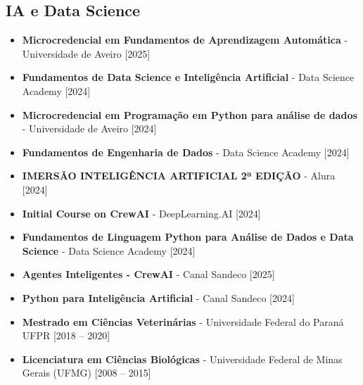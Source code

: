 \documentclass[11pt]{article}
\begin{document}
\subsection*{IA e Data Science}
\begin{itemize}
    \item \textbf{Microcredencial em Fundamentos de Aprendizagem Automática} - Universidade de Aveiro [2025]
    \item \textbf{Fundamentos de Data Science e Inteligência Artificial} - Data Science Academy [2024]
    \item \textbf{Microcredencial em Programação em Python para análise de dados} - Universidade de Aveiro [2024]
    \item \textbf{Fundamentos de Engenharia de Dados} - Data Science Academy [2024]
    \item \textbf{IMERSÃO INTELIGÊNCIA ARTIFICIAL 2ª EDIÇÃO} - Alura [2024]
    \item \textbf{Initial Course on CrewAI} - DeepLearning.AI [2024]
    \item \textbf{Fundamentos de Linguagem Python para Análise de Dados e Data Science} - Data Science Academy [2024]
    \item \textbf{Agentes Inteligentes - CrewAI} - Canal Sandeco [2025]
    \item \textbf{Python para Inteligência Artificial} - Canal Sandeco [2024]
    \item \textbf{Mestrado em Ciências Veterinárias} - Universidade Federal do Paraná UFPR [2018 – 2020]
    \item \textbf{Licenciatura em Ciências Biológicas} - Universidade Federal de Minas Gerais (UFMG) [2008 – 2015]
\end{itemize}
\end{document}
